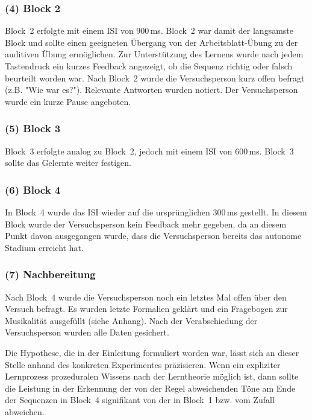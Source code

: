 \documentclass[doc,a4paper,12pt]{apa6}
\begin{document}
\subsubsection{(4) Block 2}

Block~2 erfolgte mit einem ISI von 900\,ms. Block~2 war damit der langsamste Block und sollte einen geeigneten Übergang von der Arbeitsblatt-Übung zu der auditiven Übung ermöglichen. Zur Unterstützung des Lernens wurde nach jedem Tastendruck ein kurzes Feedback angezeigt, ob die Sequenz richtig oder falsch beurteilt worden war. Nach Block~2 wurde die Versuchsperson kurz offen befragt (z.B. "Wie war es?"). Relevante Antworten wurden notiert. Der Versuchsperson wurde ein kurze Pause angeboten.

\subsubsection{(5) Block 3}

Block~3 erfolgte analog zu Block~2, jedoch mit einem ISI von 600\,ms. Block~3 sollte das Gelernte weiter festigen.

\subsubsection{(6) Block 4}

In Block~4 wurde das ISI wieder auf die ursprünglichen 300\,ms gestellt. In diesem Block wurde der Versuchsperson kein Feedback mehr gegeben, da an diesem Punkt davon ausgegangen wurde, dass die Versuchsperson bereits das autonome Stadium erreicht hat.

\subsubsection{(7) Nachbereitung}

Nach Block~4 wurde die Versuchsperson noch ein letztes Mal offen über den Versuch befragt. Es wurden letzte Formalien geklärt und ein Fragebogen zur Musikalität ausgefüllt (siehe Anhang). Nach der Verabschiedung der Versuchsperson wurden alle Daten gesichert.

Die Hypothese, die in der Einleitung formuliert worden war, lässt sich an dieser Stelle anhand des konkreten Experimentes präzisieren. Wenn ein expliziter Lernprozess prozeduralen Wissens nach der Lerntheorie möglich ist, dann sollte die Leistung in der Erkennung der von der Regel abweichenden Töne am Ende der Sequenzen in Block~4 signifikant von der in Block~1 bzw. vom Zufall abweichen.
\end{document}
